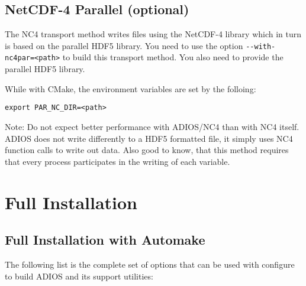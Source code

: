 \subsection{NetCDF-4 Parallel (optional)}

The NC4 transport method writes files using the NetCDF-4 library which in turn 
is based on the parallel HDF5 library. You need to use the option 
\verb+--with-nc4par=<path>+ to build this transport method. 
You also need to provide the parallel HDF5 library. 

While with CMake, the environment variables are set by the folloing:
\begin{lstlisting}
export PAR_NC_DIR=<path>
\end{lstlisting}

\noindent Note: Do not expect better performance with ADIOS/NC4 than with NC4 itself. ADIOS does not write differently to a HDF5 formatted file, it simply uses NC4 function calls to write out data. Also good to know, that this method requires that every process participates in the writing of each variable. 

\section{Full Installation}

\subsection{Full Installation with Automake}

The following list is the complete set of options that can be used with 
configure to build ADIOS and its support utilities:

